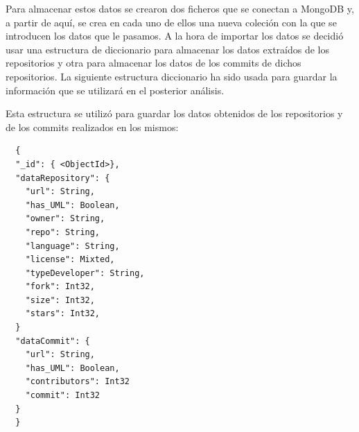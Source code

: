 \documentclass[a4paper, 12pt]{book}
\begin{document}
Para almacenar estos datos se crearon dos ficheros que se conectan a MongoDB y, a partir de aquí, se crea en cada uno de ellos una nueva coleción con la que se introducen los datos que le pasamos.
A la hora de importar los datos se decidió usar una estructura de diccionario para almacenar los datos extraídos de los repositorios y otra para almacenar los datos de los commits de dichos repositorios.
La siguiente estructura diccionario ha sido usada para guardar la información que se utilizará en el posterior análisis. 


Esta estructura se utilizó para guardar los datos obtenidos de los repositorios y de los commits realizados en los mismos:
{\footnotesize
\begin{verbatim}
  {
  "_id": { <ObjectId>},
  "dataRepository": {
    "url": String,
    "has_UML": Boolean,
    "owner": String,
    "repo": String,
    "language": String,
    "license": Mixted,
    "typeDeveloper": String,
    "fork": Int32,
    "size": Int32,
    "stars": Int32,
  }
  "dataCommit": {
    "url": String,
    "has_UML": Boolean,
    "contributors": Int32
    "commit": Int32
  }
  }
\end{verbatim}
}
\end{document}
